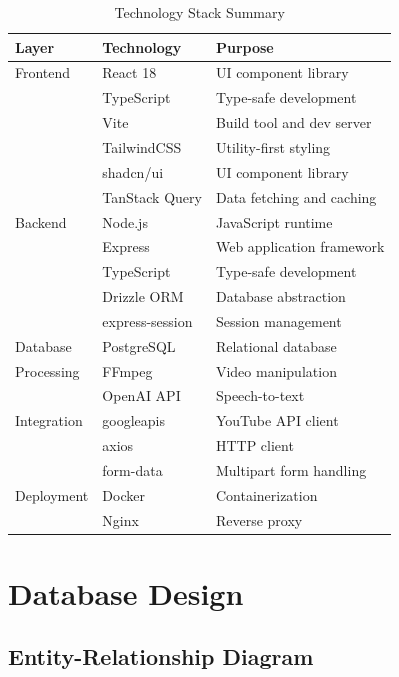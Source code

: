 \begin{table}[H]
\centering
\caption{Technology Stack Summary}
\begin{tabular}{@{}lll@{}}
\toprule
\textbf{Layer} & \textbf{Technology} & \textbf{Purpose} \\
\midrule
Frontend & React 18 & UI component library \\
 & TypeScript & Type-safe development \\
 & Vite & Build tool and dev server \\
 & TailwindCSS & Utility-first styling \\
 & shadcn/ui & UI component library \\
 & TanStack Query & Data fetching and caching \\
\midrule
Backend & Node.js & JavaScript runtime \\
 & Express & Web application framework \\
 & TypeScript & Type-safe development \\
 & Drizzle ORM & Database abstraction \\
 & express-session & Session management \\
\midrule
Database & PostgreSQL & Relational database \\
\midrule
Processing & FFmpeg & Video manipulation \\
 & OpenAI API & Speech-to-text \\
\midrule
Integration & googleapis & YouTube API client \\
 & axios & HTTP client \\
 & form-data & Multipart form handling \\
\midrule
Deployment & Docker & Containerization \\
 & Nginx & Reverse proxy \\
\bottomrule
\end{tabular}
\end{table}

\section{Database Design}

\subsection{Entity-Relationship Diagram}

